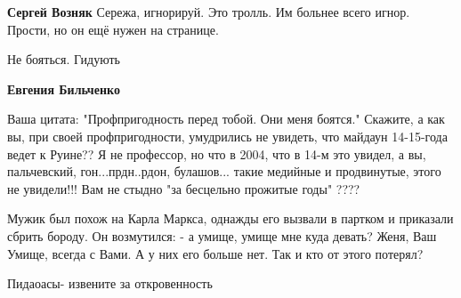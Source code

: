 \begin{itemize}
\begin{itemize}
 
\textbf{Сергей Возняк} Сережа, игнорируй. Это тролль. Им больнее всего игнор. Прости, но он ещё нужен на странице.

 
Не бояться. Гидують

 
\textbf{Евгения Бильченко} 

Ваша цитата: "Профпригодность перед тобой. Они меня боятся." Скажите, а как вы,
при своей профпригодности, умудрились не увидеть, что майдаун 14-15-года ведет
к Руине?? Я не профессор, но что в 2004, что в 14-м это увидел, а вы,
пальчевский, гон...прдн..рдон, булашов... такие медийные и продвинутые, этого не
увидели!!! Вам не стыдно "за бесцельно прожитые годы" ????  

\end{itemize}

 
\obeycr
	Мужик был похож на Карла Маркса, однажды его вызвали в партком и приказали сбрить бороду.
	Он возмутился:
	- а умище, умище мне куда девать?
	Женя, Ваш Умище, всегда с Вами. А у них его больше нет.
	Так и кто от этого потерял?
\restorecr

 
Пидаоасы- извените за откровенность

 

\end{itemize}
